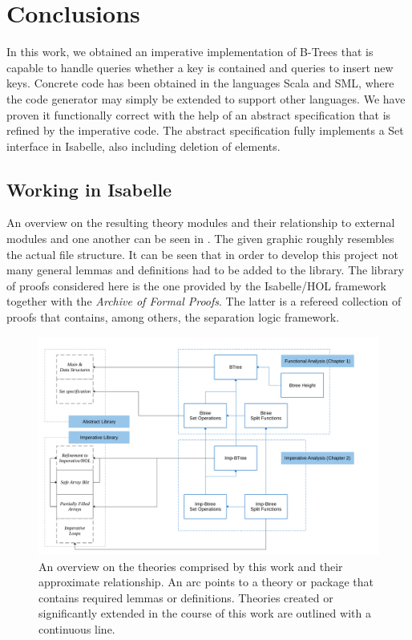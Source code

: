 

\chapter{Conclusions}\label{chapter:conclusion}

In this work, we obtained an imperative implementation
of B-Trees that is capable to handle queries whether a key is contained
and queries to insert new keys.
Concrete code has been obtained in the languages Scala and SML,
where the code generator may simply be extended to support other languages.
We have proven it functionally correct with the help of an abstract
specification that is refined by the imperative code.
The abstract specification fully implements
a Set interface in Isabelle, also including deletion of elements.

\section{Working in Isabelle}

An overview on the resulting theory modules
and their relationship to external modules and one another
can be seen in .
The given graphic roughly resembles the actual file structure.
It can be seen that in order to develop this project
not many general lemmas and definitions had to be added to the library.
The library of proofs considered here
is the one provided by the Isabelle/HOL framework together with the \textit{Archive of Formal Proofs}.
The latter is a refereed collection of proofs that contains, among others,
the separation logic framework.

\begin{figure}
    \centering
    \includegraphics[width=1.1\linewidth]{figures/theories-relationship.pdf}
    \caption[An overview on the theories comprised by this work
    and their approximate relationship.]{
    An overview on the theories comprised by this work
    and their approximate relationship.
    An arc points to a theory or package
    that contains required lemmas or definitions.
    Theories created or significantly extended in the course of this work are outlined with a continuous line.}
    \label{fig:thm-relationships}
\end{figure}


